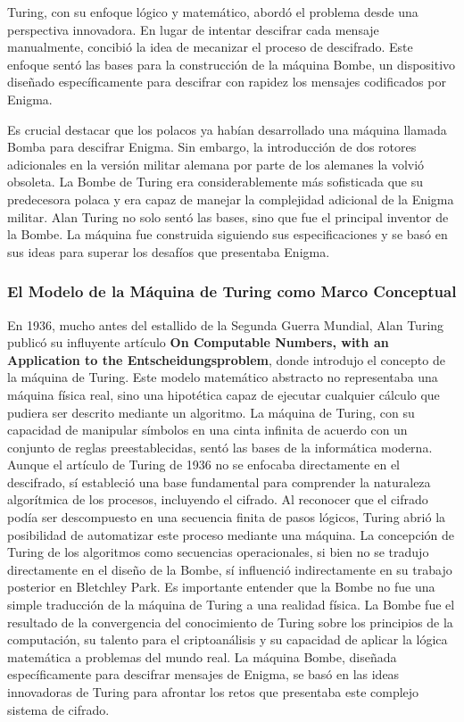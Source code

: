 \documentclass{article}
\begin{document}
Turing, con su enfoque lógico y matemático, abordó el problema desde una perspectiva innovadora.
En lugar de intentar descifrar cada mensaje manualmente, concibió la idea de mecanizar el proceso 
de descifrado. Este enfoque sentó las bases para la construcción de la máquina Bombe, un dispositivo 
diseñado específicamente para descifrar con rapidez los mensajes codificados por Enigma.

Es crucial destacar que los polacos ya habían desarrollado una máquina llamada Bomba para descifrar 
Enigma. Sin embargo, la introducción de dos rotores adicionales en la versión militar alemana por parte 
de los alemanes la volvió obsoleta. La Bombe de Turing era considerablemente más sofisticada que su
predecesora polaca y era capaz de manejar la complejidad adicional de la Enigma militar. 
Alan Turing no solo sentó las bases, sino que fue el principal inventor de la Bombe. 
La máquina fue construida siguiendo sus especificaciones y se basó en sus ideas para 
superar los desafíos que presentaba Enigma.


\subsubsection{El Modelo de la Máquina de Turing como Marco Conceptual}

En 1936, mucho antes del estallido de la Segunda Guerra Mundial,
Alan Turing publicó su influyente artículo \textbf{On Computable Numbers, with an Application to the Entscheidungsproblem}\cite{AlanTuringEnigmaO}, donde introdujo el concepto de la máquina de Turing. Este modelo matemático abstracto no representaba una máquina física real, sino una hipotética capaz de ejecutar cualquier cálculo que pudiera ser descrito mediante un algoritmo. La máquina de Turing, con su capacidad de manipular símbolos en una cinta infinita de acuerdo con un conjunto de reglas preestablecidas, sentó las bases de la informática moderna.
Aunque el artículo de Turing de 1936 no se enfocaba directamente en el descifrado,
sí estableció una base fundamental para comprender la naturaleza algorítmica de los procesos,
incluyendo el cifrado. Al reconocer que el cifrado podía ser descompuesto en una secuencia finita
de pasos lógicos, Turing abrió la posibilidad de automatizar este proceso mediante una máquina.
La concepción de Turing de los algoritmos como secuencias operacionales, si bien no se tradujo
directamente en el diseño de la Bombe, sí influenció indirectamente en su trabajo posterior en
Bletchley Park.
Es importante entender que la Bombe no fue una simple traducción de la máquina de 
Turing a una realidad física. La Bombe fue el resultado de la convergencia del conocimiento 
de Turing sobre los principios de la computación, su talento para el criptoanálisis y su capacidad 
de aplicar la lógica matemática a problemas del mundo real. La máquina Bombe, diseñada específicamente 
para descifrar mensajes de Enigma, se basó en las ideas innovadoras de Turing para afrontar los retos 
que presentaba este complejo sistema de cifrado.
\end{document}

